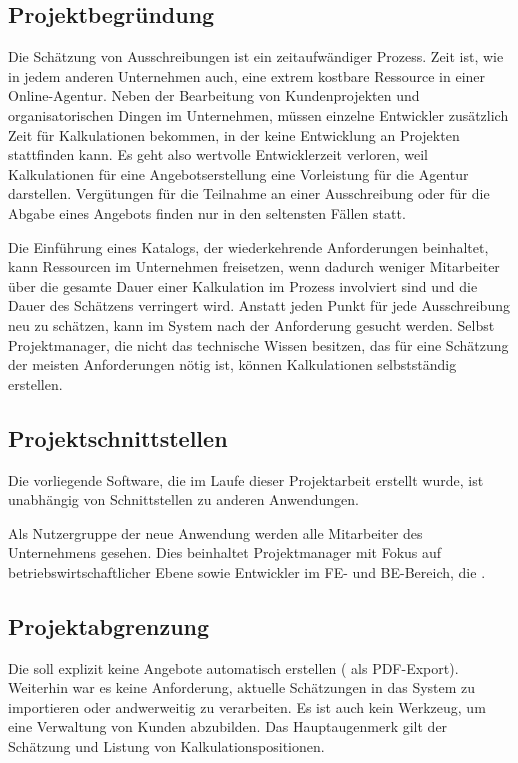 \subsection{Projektbegründung} 
\label{sec:Projektbegruendung}
Die Schätzung von Ausschreibungen ist ein zeitaufwändiger Prozess. Zeit ist, wie
in jedem anderen Unternehmen auch, eine extrem kostbare Ressource in einer
Online-Agentur. Neben der Bearbeitung von Kundenprojekten und organisatorischen
Dingen im Unternehmen, müssen einzelne Entwickler zusätzlich Zeit für
Kalkulationen bekommen, in der keine Entwicklung an Projekten stattfinden kann.
Es geht also wertvolle Entwicklerzeit verloren, weil Kalkulationen für eine
Angebotserstellung eine Vorleistung für die Agentur darstellen. Vergütungen
für die Teilnahme an einer Ausschreibung oder für die Abgabe eines Angebots
finden nur in den seltensten Fällen statt.

Die Einführung eines Katalogs, der wiederkehrende Anforderungen beinhaltet, kann
Ressourcen im Unternehmen freisetzen, wenn dadurch weniger Mitarbeiter über die
gesamte Dauer einer Kalkulation im Prozess involviert sind und die Dauer des
Schätzens verringert wird. Anstatt jeden Punkt für jede Ausschreibung neu zu
schätzen, kann im System nach der Anforderung gesucht werden. Selbst
Projektmanager, die nicht das technische Wissen besitzen, das für eine Schätzung
der meisten Anforderungen nötig ist, können Kalkulationen selbstständig
erstellen.

\subsection{Projektschnittstellen} 
\label{sec:Projektschnittstellen}
Die vorliegende Software, die im Laufe dieser Projektarbeit erstellt wurde, ist
unabhängig von Schnittstellen zu anderen Anwendungen. 

Als Nutzergruppe der neue Anwendung werden alle Mitarbeiter des Unternehmens
gesehen. Dies beinhaltet Projektmanager mit Fokus auf betriebswirtschaftlicher
Ebene sowie Entwickler im \acs{FE}- und \acs{BE}-Bereich, die .

\subsection{Projektabgrenzung} 
\label{sec:Projektabgrenzung}
Die {\untertitel} soll explizit keine Angebote automatisch erstellen (\zB
als \acs{PDF}-Export). Weiterhin war es keine Anforderung, aktuelle Schätzungen
in das System zu importieren oder andwerweitig zu verarbeiten. Es ist auch kein
Werkzeug, um eine Verwaltung von Kunden abzubilden. Das Hauptaugenmerk gilt der
Schätzung und Listung von Kalkulationspositionen.
